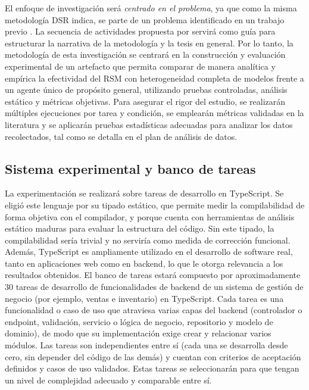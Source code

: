 El enfoque de investigación será \textit{centrado en el problema}, ya que como la misma metodología DSR indica, se parte de un problema identificado en un trabajo previo \parencite{fernandezyfernandez2026rsm}. La secuencia de actividades propuesta por \textcite{peffers2007design} servirá como guía para estructurar la narrativa de la metodología y la tesis en general.
Por lo tanto, la metodología de esta investigación se centrará en la construcción y evaluación experimental de un artefacto que permita comparar de manera analítica y empírica la efectividad del RSM con heterogeneidad completa de modelos frente a un agente único de propósito general, utilizando pruebas controladas, análisis estático y métricas objetivas. Para asegurar el rigor del estudio, se realizarán múltiples ejecuciones por tarea y condición, se emplearán métricas validadas en la literatura y se aplicarán pruebas estadísticas adecuadas para analizar los datos recolectados, tal como se detalla en el plan de análisis de datos.


\subsection{Sistema experimental y banco de tareas}

La experimentación se realizará sobre tareas de desarrollo en TypeScript. Se eligió este lenguaje por su tipado estático, que permite medir la compilabilidad de forma objetiva con el compilador, y porque cuenta con herramientas de análisis estático maduras para evaluar la estructura del código. Sin este tipado, la compilabilidad sería trivial y no serviría como medida de corrección funcional. Además, TypeScript es ampliamente utilizado en el desarrollo de software real, tanto en aplicaciones web como en backend, lo que le otorga relevancia a los resultados obtenidos. El banco de tareas estará compuesto por aproximadamente 30 tareas de desarrollo de funcionalidades de backend de un sistema de gestión de negocio (por ejemplo, ventas e inventario) en TypeScript. Cada tarea es una funcionalidad o caso de uso que atraviesa varias capas del backend (controlador o endpoint, validación, servicio o lógica de negocio, repositorio y modelo de dominio), de modo que su implementación exige crear y relacionar varios módulos. Las tareas son independientes entre sí (cada una se desarrolla desde cero, sin depender del código de las demás) y cuentan con criterios de aceptación definidos y casos de uso validados. Estas tareas se seleccionarán para que tengan un nivel de complejidad adecuado y comparable entre sí.

